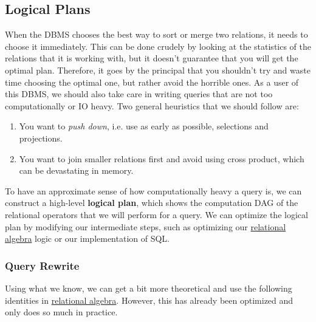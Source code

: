 \subsection{Logical Plans}

    When the DBMS chooses the best way to sort or merge two relations, it needs to choose it immediately. This can be done crudely by looking at the statistics of the relations that it is working with, but it doesn't guarantee that you will get the optimal plan. Therefore, it goes by the principal that you shouldn't try and waste time choosing the optimal one, but rather avoid the horrible ones. As a user of this DBMS, we should also take care in writing queries that are not too computationally or IO heavy. Two general heuristics that we should follow are: 
    \begin{enumerate}
      \item You want to \textit{push down}, i.e. use as early as possible, selections and projections. 
      \item You want to join smaller relations first and avoid using cross product, which can be devastating in memory. 
    \end{enumerate}

    \begin{definition}
      \label{def:logical-plan}
      To have an approximate sense of how computationally heavy a query is, we can construct a high-level \textbf{logical plan}, which shows the computation DAG of the relational operators that we will perform for a query. We can optimize the logical plan by modifying our intermediate steps, such as optimizing our \hyperref[def:relational-algebra]{relational algebra} logic or our implementation of SQL. 
    \end{definition}

  \subsubsection{Query Rewrite}

    Using what we know, we can get a bit more theoretical and use the following identities in \hyperref[def:relational-algebra]{relational algebra}. However, this has already been optimized and only does so much in practice. 

